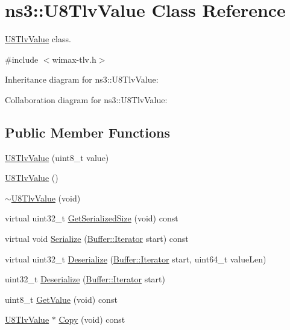 \hypertarget{classns3_1_1U8TlvValue}{}\section{ns3\+:\+:U8\+Tlv\+Value Class Reference}
\label{classns3_1_1U8TlvValue}


\hyperlink{classns3_1_1U8TlvValue}{U8\+Tlv\+Value} class.  




{\ttfamily \#include $<$wimax-\/tlv.\+h$>$}



Inheritance diagram for ns3\+:\+:U8\+Tlv\+Value\+:


Collaboration diagram for ns3\+:\+:U8\+Tlv\+Value\+:
\subsection*{Public Member Functions}
\begin{DoxyCompactItemize}
\item 
\hyperlink{classns3_1_1U8TlvValue_a061756e3d14a9ebce7fd7dcb43f6388b}{U8\+Tlv\+Value} (uint8\+\_\+t value)
\item 
\hyperlink{classns3_1_1U8TlvValue_afc2a6a8a84241621d2fdc4ec368f8913}{U8\+Tlv\+Value} ()
\item 
\hyperlink{classns3_1_1U8TlvValue_af558594e2031301143241563f4abbf1f}{$\sim$\+U8\+Tlv\+Value} (void)
\item 
virtual uint32\+\_\+t \hyperlink{classns3_1_1U8TlvValue_a4fc3ebe048f5bfaa1e9d7419078be164}{Get\+Serialized\+Size} (void) const 
\item 
virtual void \hyperlink{classns3_1_1U8TlvValue_a91bd6229349ff701c2f288ab1a30589a}{Serialize} (\hyperlink{classns3_1_1Buffer_1_1Iterator}{Buffer\+::\+Iterator} start) const 
\item 
virtual uint32\+\_\+t \hyperlink{classns3_1_1U8TlvValue_a24cd462e759d9384dfc50b595d8088bb}{Deserialize} (\hyperlink{classns3_1_1Buffer_1_1Iterator}{Buffer\+::\+Iterator} start, uint64\+\_\+t value\+Len)
\item 
uint32\+\_\+t \hyperlink{classns3_1_1U8TlvValue_a94a21c758937ad2eb30704b4014d61ee}{Deserialize} (\hyperlink{classns3_1_1Buffer_1_1Iterator}{Buffer\+::\+Iterator} start)
\item 
uint8\+\_\+t \hyperlink{classns3_1_1U8TlvValue_a4684c3c637cfa8dc1c4da9476a216c0f}{Get\+Value} (void) const 
\item 
\hyperlink{classns3_1_1U8TlvValue}{U8\+Tlv\+Value} $\ast$ \hyperlink{classns3_1_1U8TlvValue_a5c9028a5c45205a931031bbe0e6a4051}{Copy} (void) const 
\end{DoxyCompactItemize}
